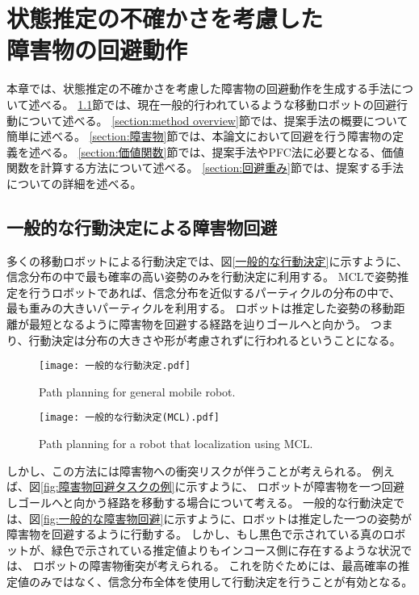 \chapter{状態推定の不確かさを考慮した\\障害物の回避動作} \label{chapter:method}
本章では、状態推定の不確かさを考慮した障害物の回避動作を生成する手法について述べる。
\ref{section:一般的な回避}節では、現在一般的行われているような移動ロボットの回避行動について述べる。
\ref{section:method overview}節では、提案手法の概要について簡単に述べる。
\ref{section:障害物}節では、本論文において回避を行う障害物の定義を述べる。
\ref{section:価値関数}節では、提案手法やPFC法に必要となる、価値関数を計算する方法について述べる。
\ref{section:回避重み}節では、提案する手法についての詳細を述べる。


\section{一般的な行動決定による障害物回避} \label{section:一般的な回避}
多くの移動ロボットによる行動決定では、図\ref{一般的な行動決定}に示すように、
信念分布の中で最も確率の高い姿勢のみを行動決定に利用する。
MCLで姿勢推定を行うロボットであれば、信念分布を近似するパーティクルの分布の中で、
最も重みの大きいパーティクルを利用する。
ロボットは推定した姿勢の移動距離が最短となるように障害物を回避する経路を辿りゴールへと向かう。
つまり、行動決定は分布の大きさや形が考慮されずに行われるということになる。

\begin{figure}[h]
  \begin{center}
    \texttt{[image: 一般的な行動決定.pdf]}
    \caption{Path planning for general mobile robot.}
    \label{fig:一般的な行動決定}
  \end{center}
\end{figure}

\begin{figure}[h]
  \begin{center}
    \texttt{[image: 一般的な行動決定(MCL).pdf]}
    \caption{Path planning for a robot that localization using MCL.}
    \label{fig:一般的な行動決定(MCL)}
  \end{center}
\end{figure}

しかし、この方法には障害物への衝突リスクが伴うことが考えられる。
例えば、図\ref{fig:障害物回避タスクの例}に示すように、
ロボットが障害物を一つ回避しゴールへと向かう経路を移動する場合について考える。
一般的な行動決定では、図\ref{fig:一般的な障害物回避}に示すように、ロボットは推定した一つの姿勢が障害物を回避するように行動する。
しかし、もし黒色で示されている真のロボットが、緑色で示されている推定値よりもインコース側に存在するような状況では、
ロボットの障害物衝突が考えられる。
これを防ぐためには、最高確率の推定値のみではなく、信念分布全体を使用して行動決定を行うことが有効となる。

